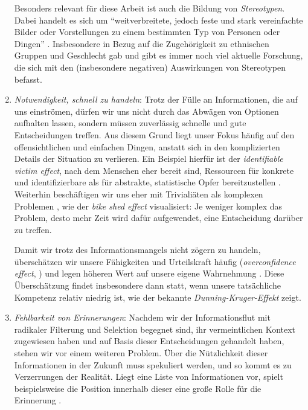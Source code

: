 \begin{enumerate}
	Besonders relevant für diese Arbeit ist auch die Bildung von \emph{Stereotypen}.
	Dabei handelt es sich um ``weitverbreitete, jedoch feste und stark vereinfachte Bilder oder Vorstellungen zu einem bestimmten Typ von Personen oder Dingen'' \citep[Übers. d. Verf.]{bordalo2016stereotypes}.
	Insbesondere in Bezug auf die Zugehörigkeit zu ethnischen Gruppen \citep{brigham1971ethnic, guichard1977ethnic, mastro2009effects} und Geschlecht \citep{hoffman1990gender, heilman2012gender, haines2016times, ellemers2018gender} gab und gibt es immer noch viel aktuelle Forschung, die sich mit den (insbesondere negativen) Auswirkungen von Stereotypen befasst.
	
	\item \emph{Notwendigkeit, schnell zu handeln}: Trotz der Fülle an Informationen, die auf uns einströmen, dürfen wir uns nicht durch das Abwägen von Optionen aufhalten lassen, sondern müssen zuverlässig schnelle und gute Entscheidungen treffen.
	Aus diesem Grund liegt unser Fokus häufig auf den offensichtlichen und einfachen Dingen, anstatt sich in den komplizierten Details der Situation zu verlieren.
	Ein Beispiel hierfür ist der \emph{identifiable victim effect}, nach dem Menschen eher bereit sind, Ressourcen für konkrete und identifizierbare als für abstrakte, statistische Opfer bereitzustellen \citep{jenni1997explaining}.
	Weiterhin beschäftigen wir uns eher mit Trivialiäten als komplexen Problemen \citep{parkinson1958parkinson}, wie der \emph{bike shed effect} visualisiert:
	Je weniger komplex das Problem, desto mehr Zeit wird dafür aufgewendet, eine Entscheidung darüber zu treffen.
	
	Damit wir trotz des Informationsmangels nicht zögern zu handeln, überschätzen wir unsere Fähigkeiten und Urteilskraft häufig (\emph{overconfidence effect}, \cite{moore2008trouble}) und legen höheren Wert auf unsere eigene Wahrnehmung \citep{ross1979egocentric}.
	Diese Überschätzung findet insbesondere dann statt, wenn unsere tatsächliche Kompetenz relativ niedrig ist, wie der bekannte \emph{Dunning-Kruger-Effekt} \citep{dunning2011dunning} zeigt.
	
	\item \emph{Fehlbarkeit von Erinnerungen}: Nachdem wir der Informationsflut mit radikaler Filterung und Selektion begegnet sind, ihr vermeintlichen Kontext zugewiesen haben und auf Basis dieser Entscheidungen gehandelt haben, stehen wir vor einem weiteren Problem.
	Über die Nützlichkeit dieser Informationen in der Zukunft muss spekuliert werden, und so kommt es zu Verzerrungen der Realität.
	Liegt eine Liste von Informationen vor, spielt beispielsweise die Position innerhalb dieser eine große Rolle für die Erinnerung \citep{murdock1962serial, phillips1967effects}.
	

\end{enumerate}
